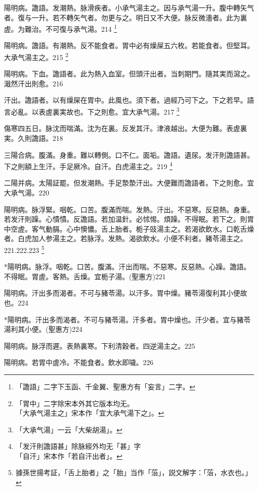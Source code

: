 \documentclass[b5paper,twoside,zihao=-4,UTF8]{ctexbook}
\begin{document}
陽明病。譫語。发潮熱。脉滑疾者。{小}承气湯主之。因与承气湯一升。腹中轉矢气者。復与一升。若不轉矢气者。勿更与之。明日又不大便。脉反微濇者。此为裏虗。为難治。不可復与承气湯。214
	\footnote{「譫語」二字下玉函、千金翼、聖惠方有「妄言」二字。}

陽明病。譫語。有潮熱。反不能食者。{胃中}必有燥屎五六枚。若能食者。但堅耳。{大}承气湯主之。215
	\footnote{「胃中」二字除宋本外其它版本均无。\\「大承气湯主之」宋本作「宜大承气湯下之」。}

陽明病。下血。譫語者。此为熱入血室。但頭汗出者。当刺期門。隨其実而瀉之。濈然汗出則愈。216

汗出。譫語者。以有燥屎在胃中。此風也。{須下者。}過經乃可下之。下之若早。語言必亂。以表虗裏実故也。下之則愈。宜{大}承气湯。217
	\footnote{「大承气湯」一云「大柴胡湯」。}

傷寒四五日。脉沈而喘滿。沈为在裏。反发其汗。津液越出。大便为難。表虗裏実。久則譫語。218

三陽合病。腹滿。身重。難以轉側。口不仁。面垢。譫語。遺尿。发汗則譫語{甚}。下之則額上生汗。手足厥冷。自汗。白虎湯主之。219
	\footnote{「发汗則譫語甚」除脉經外均无「甚」字\\「自汗」宋本作「若自汗出者」。}

二陽并病。太陽証罷。但发潮熱。手足漐漐汗出。大便難而譫語者。下之則愈。宜{大}承气湯。220

陽明病。脉浮緊。咽乾。口苦。腹滿而喘。发熱。汗出。不惡寒。反惡熱。身重。若发汗則躁。心憒憒。反譫語。若加温針。必怵惕。煩躁。不得眠。若下之。則胃中空虗。客气動膈。心中懊憹。舌上胎者。栀子{豉}湯主之。若渴欲飲水。口乾舌燥者。白虎{加人参}湯主之。若脉浮。发熱。渴欲飲水。小便不利者。豬苓湯主之。221.222.223
	\footnote{據孫世揚考証，「舌上胎者」之「胎」当作「菭」，説文解字：「菭，水衣也。」}

*陽明病。脉浮。咽乾。口苦。腹滿。汗出而喘。不惡寒。反惡熱。心躁。譫語。不得眠。胃虗。客熱。舌燥。宜栀子湯。(聖惠方)221

陽明病。汗出多而渴者。不可与豬苓湯。以汗多。胃中燥。豬苓湯復利其小便故也。224

*陽明病。汗出多而渴者。不可与豬苓湯。汗多者。胃中燥也。汗少者。宜与豬苓湯利其小便。(聖惠方)224

{陽明病。}脉浮而遲。表熱裏寒。下利清穀者。四逆湯主之。225

{陽明病。}若胃中虗冷。不能食者。飲水即噦。226
\end{document}
